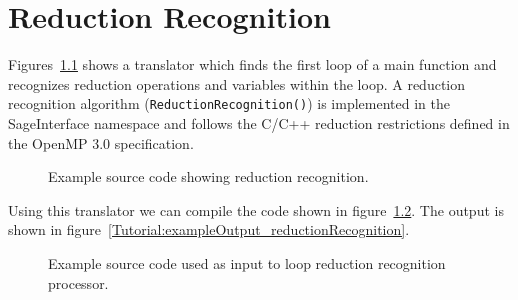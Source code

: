 \chapter{Reduction Recognition}

Figures~\ref{Tutorial:exampleReductionRecognition} 
shows a translator which
finds the first loop of a main function and recognizes reduction operations
and variables within the loop.  
A reduction recognition algorithm (\lstinline{ReductionRecognition()}) is implemented in the SageInterface
namespace and follows the C/C++ reduction restrictions defined in the
OpenMP 3.0 specification. 

\begin{figure}[!h]
{\indent
{\mySmallestFontSize


\begin{latexonly}
   
\end{latexonly}

\begin{htmlonly}
   
\end{htmlonly}

}
}
\caption{Example source code showing reduction recognition.}
\label{Tutorial:exampleReductionRecognition}
\end{figure}


Using this translator we can compile the code shown in 
figure~\ref{Tutorial:exampleInputCode_reductionRecognition}.  
The output is shown in figure~\ref{Tutorial:exampleOutput_reductionRecognition}.

\begin{figure}[!h]
{\indent
{\mySmallFontSize
\begin{latexonly}
   
\end{latexonly}

\begin{htmlonly}
   
\end{htmlonly}

}
}
\caption{Example source code used as input to loop reduction recognition processor.}
\label{Tutorial:exampleInputCode_reductionRecognition}
\end{figure}

